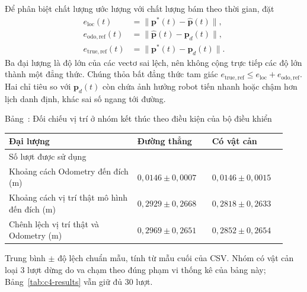 \documentclass[12pt,a4paper,oneside]{report}
\renewcommand{\tablename}{Bảng}
\begin{document}
Để phân biệt chất lượng ước lượng với chất lượng bám theo thời gian, đặt
\begin{equation}
  \begin{aligned}
  e_{\mathrm{loc}}(t)&=\|\mathbf p^{*}(t)-\widehat{\mathbf p}(t)\|,\\
  e_{\mathrm{odo,ref}}(t)&=\|\widehat{\mathbf p}(t)-\mathbf p_d(t)\|,\\
  e_{\mathrm{true,ref}}(t)&=\|\mathbf p^{*}(t)-\mathbf p_d(t)\|.
  \end{aligned}
  \label{eq:c4-error-decomposition}
\end{equation}
Ba đại lượng là độ lớn của các vectơ sai lệch, nên không cộng trực tiếp các độ lớn thành một đẳng thức. Chúng thỏa bất đẳng thức tam giác \(e_{\mathrm{true,ref}}\leq e_{\mathrm{loc}}+e_{\mathrm{odo,ref}}\). Hai chỉ tiêu so với \(\mathbf p_d(t)\) còn chứa ảnh hưởng robot tiến nhanh hoặc chậm hơn lịch danh định, khác sai số ngang tới đường.

\begin{center}
\begin{minipage}{\linewidth}
  \centering
  \label{tab:c4-localization}
  \tablename~\thetable: Đối chiếu vị trí ở nhóm kết thúc theo điều kiện của bộ điều khiển\par\smallskip
  \small\singlespacing
  \renewcommand{\arraystretch}{1.22}
  \begin{tabular}{@{}>{\raggedright\arraybackslash}p{0.43\linewidth}>{\raggedright\arraybackslash}p{0.25\linewidth}>{\raggedright\arraybackslash}p{0.25\linewidth}@{}}
    \toprule
    \textbf{Đại lượng} & \textbf{Đường thẳng} & \textbf{Có vật cản}\\
    \midrule
    Số lượt được sử dụng & 30 & 27\\
    Khoảng cách Odometry đến đích (m) & \(0{,}0146\pm0{,}0007\) & \(0{,}0146\pm0{,}0015\)\\
    Khoảng cách vị trí thật mô hình đến đích (m) & \(0{,}2929\pm0{,}2668\) & \(0{,}2818\pm0{,}2633\)\\
    Chênh lệch vị trí thật và Odometry (m) & \(0{,}2969\pm0{,}2651\) & \(0{,}2852\pm0{,}2654\)\\
    \bottomrule
  \end{tabular}
  \par\smallskip\begin{minipage}{0.97\linewidth}\footnotesize Trung bình \(\pm\) độ lệch chuẩn mẫu, tính từ mẫu cuối của CSV. Nhóm có vật cản loại 3 lượt dừng do va chạm theo đúng phạm vi thống kê của bảng này; Bảng~\ref{tab:c4-results} vẫn giữ đủ 30 lượt.\end{minipage}
\end{minipage}
\end{center}
\end{document}
